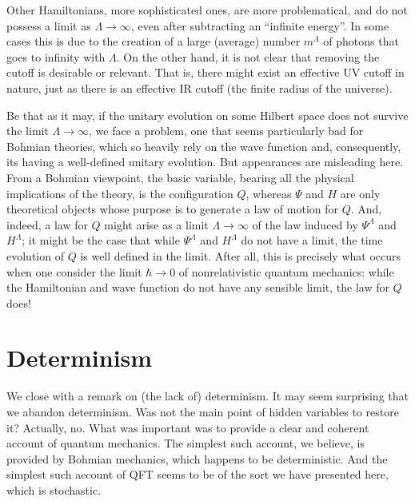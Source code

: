 \documentclass[12pt]{article}
\begin{document}
Other Hamiltonians, more sophisticated ones, are more problematical, and do
not possess a limit as $\Lambda \to \infty$, even after subtracting an
``infinite energy''. In some cases this is due to the creation of a large
(average) number $m^\Lambda$ of photons that goes to infinity with
$\Lambda$. On the other hand, it is not clear that removing the cutoff is
desirable or relevant. That is, there might exist an effective UV cutoff in
nature, just as there is an effective IR cutoff (the finite radius of the
universe).

Be that as it may, if the unitary evolution on some Hilbert space does not
survive the limit $\Lambda\to\infty$, we face a problem, one that seems
particularly bad for Bohmian theories, which so heavily rely on the wave
function and, consequently, its having a well-defined unitary
evolution. But appearances are misleading here. From a Bohmian viewpoint,
the basic variable, bearing all the physical implications of the theory, is
the configuration $Q$, whereas $\Psi$ and $H$ are only theoretical objects
whose purpose is to generate a law of motion for $Q$. And, indeed, a law
for $Q$ might arise as a limit $\Lambda\to\infty$ of the law induced by
$\Psi^\Lambda$ and $H^\Lambda$; it might be the case that while
$\Psi^\Lambda$ and $H^\Lambda$ do not have a limit, the time evolution of
$Q$ is well defined in the limit. After all, this is precisely what occurs
when one consider the limit $\hbar\to 0$ of nonrelativistic quantum
mechanics: while the Hamiltonian and wave function do not have any sensible
limit, the law for $Q$ does!


\section{Determinism}

We close with a remark on (the lack of) determinism. It may seem surprising
that we abandon determinism. Was not the main point of hidden variables to
restore it? Actually, no. What was important was to provide a clear and
coherent account of quantum mechanics. The simplest such account, we
believe, is provided by Bohmian mechanics, which happens to be
deterministic. And the simplest such account of QFT seems to be of the sort
we have presented here, which is stochastic.
\end{document}
